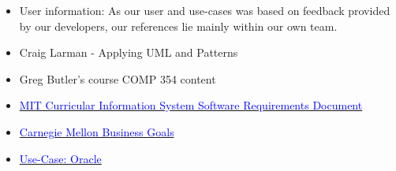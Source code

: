 \documentclass[11pt]{article}
\newcounter{use case ID}
\begin{document}
\begin{itemize}
\item User information: As our user and use-cases was based on feedback provided by our developers, our references lie mainly within our own team.
\item Craig Larman - Applying UML and Patterns
\item Greg Butler's course COMP 354 content
\item \href{http://web.mit.edu/ssit/cis/CISRequirements.html}{\textcolor{blue}{MIT Curricular Information System
Software Requirements Document}}
\item \href{https://resources.sei.cmu.edu/asset_files/TechnicalReport/2005_005_001_14621.pdf}{\textcolor{blue}{Carnegie Mellon Business Goals}}
\item \href{http://www.oracle.com/technetwork/testcontent/gettingstartedwithusecasemodeling-133857.pdf}{\textcolor{blue}{Use-Case: Oracle }}

\end{itemize}
\end{document}
